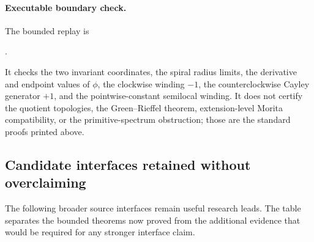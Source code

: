 \paragraph{Executable boundary check.}
The bounded replay is
\begin{center}
\footnotesize
{}.
\end{center}
It checks the two invariant coordinates, the
spiral radius limits, the derivative and endpoint values of $\phi$, the
clockwise winding $-1$, the counterclockwise Cayley generator $+1$, and the
pointwise-constant semilocal winding.  It does not certify the quotient
topologies, the Green--Rieffel theorem, extension-level Morita compatibility,
or the primitive-spectrum obstruction; those are the standard proofs printed
above.













\subsection{Candidate interfaces retained without overclaiming}

The following broader source interfaces remain useful research leads.  The
table separates the bounded theorems now proved from the additional evidence
that would be required for any stronger interface claim.

